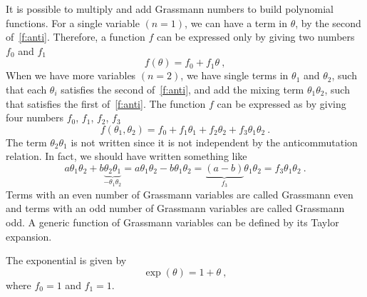     It is possible to multiply and add Grassmann numbers to build polynomial functions. For a single variable $(n = 1)$, we can have a term in $\theta$, by the second of~\eqref{f:anti}. Therefore, a function $f$ can be expressed only by giving two numbers $f_0$ and $f_1$
    \begin{equation*}
        f(\theta) = f_0 + f_1 \theta ~,
    \end{equation*}
    When we have more variables $(n=2)$, we have single terms in $\theta_1$ and $\theta_2$, such that each $\theta_i$ satisfies the second of~\eqref{f:anti}, and add the mixing term $\theta_1 \theta_2$, such that satisfies the first of~\eqref{f:anti}. The function $f$ can be expressed as by giving four numbers $f_0$, $f_1$, $f_2$, $f_3$
    \begin{equation*} 
        f(\theta_1, \theta_2) = f_0 + f_1 \theta_1 + f_2 \theta_2 + f_3 \theta_1 \theta_2 ~.
    \end{equation*} 
    The term $\theta_2 \theta_1$ is not written since it is not independent by the anticommutation relation. In fact, we should have written something like 
    \begin{equation*}
        a \theta_1 \theta_2 + b \underbrace{\theta_2 \theta_1}_{-\theta_1 \theta_2} = a \theta_1 \theta_2 - b \theta_1 \theta_2 = \underbrace{(a - b)}_{f_3} \theta_1 \theta_2 = f_3 \theta_1 \theta_2 ~.
    \end{equation*}
    Terms with an even number of Grassmann variables are called Grassmann even and terms with an odd number of Grassmann variables are called Grassmann odd. A generic function of Grassmann variables can be defined by its Taylor expansion. 
    \begin{example}
        The exponential is given by
        \begin{equation*}
            \exp(\theta) = 1 + \theta ~,
        \end{equation*}
        where $f_0 = 1$ and $f_1 = 1$.
    \end{example}
    
